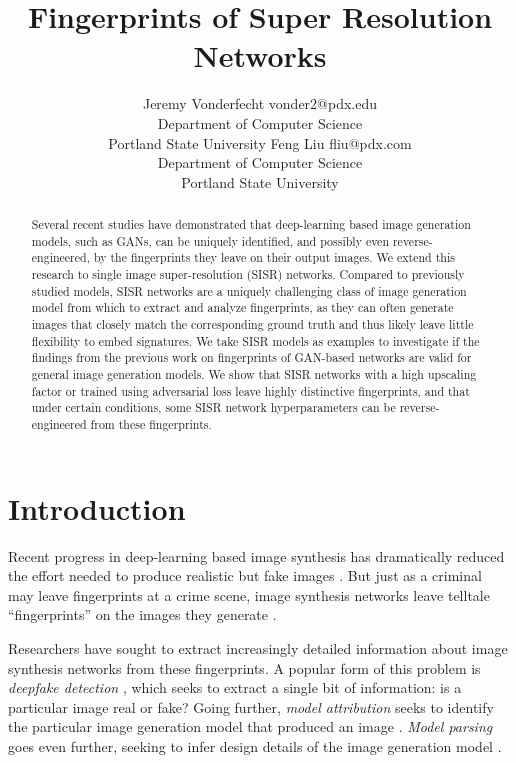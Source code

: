 \documentclass[10pt]{article} %
\title{Fingerprints of Super Resolution Networks}
\author{\name Jeremy Vonderfecht \email vonder2@pdx.edu \\
      \addr Department of Computer Science\\
      Portland State University
      \AND
      \name Feng Liu \email fliu@pdx.com\\
     \addr Department of Computer Science\\
      Portland State University}
\begin{document}
\maketitle

\begin{abstract}
Several recent studies have demonstrated that deep-learning based image generation models, such as GANs, can be uniquely identified, and possibly even reverse-engineered, by the fingerprints they leave on their output images. We extend this research to single image super-resolution (SISR) networks. Compared to previously studied models, SISR networks are a uniquely challenging class of image generation model from which to extract and analyze fingerprints, as they can often generate images that closely match the corresponding ground truth and thus likely leave little flexibility to embed signatures. We take SISR models as examples to investigate if the findings from the previous work on fingerprints of GAN-based networks are valid for general image generation models. We show that SISR networks with a high upscaling factor or trained using adversarial loss leave highly distinctive fingerprints, and that under certain conditions, some SISR network hyperparameters can be reverse-engineered from these fingerprints.
\end{abstract}

\section{Introduction}
\label{sec:introduction}

Recent progress in deep-learning based image synthesis has dramatically reduced the effort needed to produce realistic but fake images \citep{tolosana2020deepfakes}. But just as a criminal may leave fingerprints at a crime scene, image synthesis networks leave telltale ``fingerprints'' on the images they generate \citep{marra2018gans}.

Researchers have sought to extract increasingly detailed information about image synthesis networks from these fingerprints. A popular form of this problem is \textit{deepfake detection} \citep{dolhansky2019deepfake}, which seeks to extract a single bit of information: is a particular image real or fake? Going further, \textit{model attribution} seeks to identify the particular image generation model that produced an image \citep{yu2019attributing}. \textit{Model parsing} goes even further, seeking to infer design details of the image generation model \citep{Asnani2021ReverseEO}.
\end{document}
